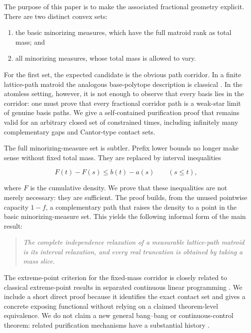 \documentclass[11pt]{article}
\numberwithin{equation}{section}
\begin{document}
The purpose of this paper is to make the associated fractional geometry explicit.
There are two distinct convex sets:

\begin{enumerate}
\item the basic minorizing measures, which have the full matroid rank as total mass; and
\item all minorizing measures, whose total mass is allowed to vary.

\end{enumerate}

For the first set, the expected candidate is the obvious path corridor. In a finite
lattice-path matroid the analogous base-polytope description is classical \cite{bidkhori2012,ohxiang2022}. In the
atomless setting, however, it is not enough to observe that every basis lies in the
corridor: one must prove that every fractional corridor path is a weak-star limit of
genuine basis paths. We give a self-contained purification proof that remains valid for
an arbitrary closed set of constrained times, including infinitely many complementary
gaps and Cantor-type contact sets.

The full minorizing-measure set is subtler. Prefix lower bounds no longer make sense
without fixed total mass. They are replaced by interval inequalities

\nopagebreak[4]
\[
F(t)-F(s)\le b(t)-a(s)\qquad(s\le t),
\]

where $F$ is the cumulative density. We prove that these inequalities are not merely
necessary: they are sufficient. The proof builds, from the unused pointwise capacity
$1-f$, a complementary path that raises the density to a point in the basic
minorizing-measure set. This yields the following informal form of the main result:

\begin{quote}\itshape
The complete independence relaxation of a measurable lattice-path matroid is its
interval relaxation, and every real truncation is obtained by taking a mass slice.
\end{quote}


The extreme-point criterion for the fixed-mass corridor is closely related to classical
extreme-point results in separated continuous linear programming \cite{anderson1983,andersonnash1987}. We include a
short direct proof because it identifies the exact contact set and gives a concrete
exposing functional without relying on a claimed theorem-level equivalence. We do not
claim a new general bang--bang or continuous-control theorem: related purification
mechanisms have a substantial history \cite{amarcellina1994,carlota2016}.
\end{document}
